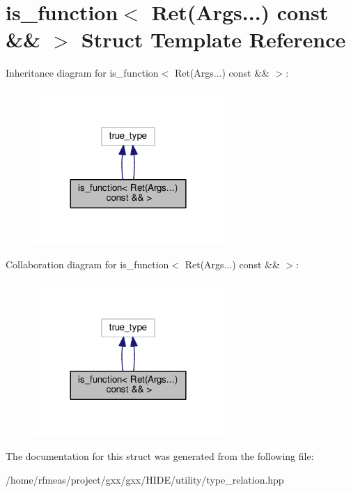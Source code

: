 \hypertarget{structis__function_3_01Ret_07Args_8_8_8_08_01const_01_6_6_01_4}{}\section{is\+\_\+function$<$ Ret(Args...) const \&\& $>$ Struct Template Reference}
\label{structis__function_3_01Ret_07Args_8_8_8_08_01const_01_6_6_01_4}


Inheritance diagram for is\+\_\+function$<$ Ret(Args...) const \&\& $>$\+:
\nopagebreak
\begin{figure}[H]
\begin{center}
\leavevmode
\includegraphics[width=204pt]{structis__function_3_01Ret_07Args_8_8_8_08_01const_01_6_6_01_4__inherit__graph}
\end{center}
\end{figure}


Collaboration diagram for is\+\_\+function$<$ Ret(Args...) const \&\& $>$\+:
\nopagebreak
\begin{figure}[H]
\begin{center}
\leavevmode
\includegraphics[width=204pt]{structis__function_3_01Ret_07Args_8_8_8_08_01const_01_6_6_01_4__coll__graph}
\end{center}
\end{figure}


The documentation for this struct was generated from the following file\+:\begin{DoxyCompactItemize}
\item 
/home/rfmeas/project/gxx/gxx/\+H\+I\+D\+E/utility/type\+\_\+relation.\+hpp\end{DoxyCompactItemize}
